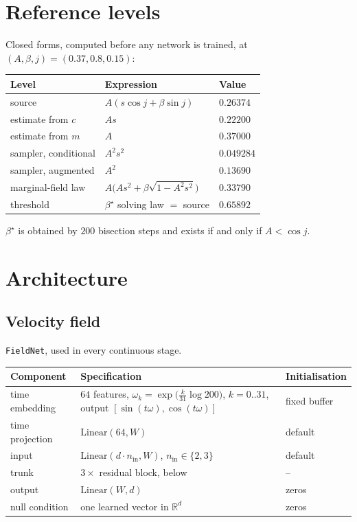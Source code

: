 \documentclass[11pt]{article}
\newcommand{\R}{\mathbb{R}}
\begin{document}
\section{Reference levels}

Closed forms, computed before any network is trained, at $(A,\beta,j)=(0.37,0.8,0.15)$:

\begin{center}
\begin{tabular}{@{}lll@{}}
\toprule
Level & Expression & Value\\
\midrule
source & $A(s\cos j+\beta\sin j)$ & $0.26374$\\
estimate from $c$ & $As$ & $0.22200$\\
estimate from $m$ & $A$ & $0.37000$\\
sampler, conditional & $A^2s^2$ & $0.049284$\\
sampler, augmented & $A^2$ & $0.13690$\\
marginal-field law & $A\big(As^2+\beta\sqrt{1-A^2s^2}\big)$ & $0.33790$\\
threshold & $\beta^\star$ solving law $=$ source & $0.65892$\\
\bottomrule
\end{tabular}
\end{center}

$\beta^\star$ is obtained by $200$ bisection steps and exists if and only if $A<\cos j$.

\section{Architecture}

\subsection*{Velocity field}

\texttt{FieldNet}, used in every continuous stage.

\begin{center}
\begin{tabular}{@{}lll@{}}
\toprule
Component & Specification & Initialisation\\
\midrule
time embedding & $64$ features, $\omega_k=\exp\!\big(\tfrac{k}{31}\log 200\big)$, $k=0..31$,
  output $[\sin(t\omega),\cos(t\omega)]$ & fixed buffer\\
time projection & $\mathrm{Linear}(64,W)$ & default\\
input & $\mathrm{Linear}(d\cdot n_{\mathrm{in}},W)$, $n_{\mathrm{in}}\in\{2,3\}$ & default\\
trunk & $3\times$ residual block, below & --\\
output & $\mathrm{Linear}(W,d)$ & zeros\\
null condition & one learned vector in $\R^{d}$ & zeros\\
\bottomrule
\end{tabular}
\end{center}
\end{document}

